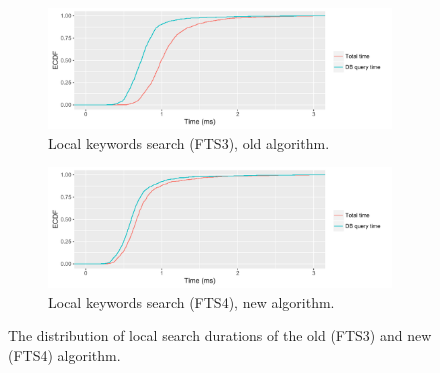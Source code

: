 \begin{figure}[t]
	\centering
	\begin{subfigure}[b]{1\textwidth}
		\includegraphics[width=1\linewidth]{images/experiments/local_search_fts3}
		\caption{Local keywords search (FTS3), old algorithm.}
		\label{fig:local-keyword-search-fts3} 
	\end{subfigure}
	
	\begin{subfigure}[b]{1\textwidth}
		\includegraphics[width=1\linewidth]{images/experiments/local_search_fts4}
		\caption{Local keywords search (FTS4), new algorithm.}
		\label{fig:local-keyword-search-fts4}
	\end{subfigure}
	
	\caption{The distribution of local search durations of the old (FTS3) and new (FTS4) algorithm.}
	\label{fig:local-keyword-search}
\end{figure}

